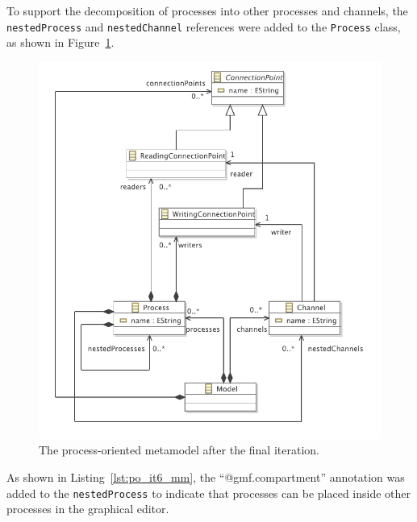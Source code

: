 To support the decomposition of processes into other processes and channels, the \texttt{ne\-st\-edPr\-oc\-e\-ss} and \texttt{ne\-st\-edCh\-an\-n\-el} references were added to the \texttt{Pr\-oc\-e\-ss} class, as shown in Figure~\ref{fig:po_it6_mm}. 

\begin{figure}[htbp]
	\centering
		\includegraphics[scale=0.75]{A.2.ProcessOriented/images/6_mm.pdf}
	\caption{The process-oriented metamodel after the final iteration.}
	\label{fig:po_it6_mm}
\end{figure}

As shown in Listing~\ref{lst:po_it6_mm}, the ``@gmf.compartment'' annotation was added to the \texttt{ne\-st\-edPr\-oc\-e\-ss} to indicate that processes can be placed inside other processes in the graphical editor.

